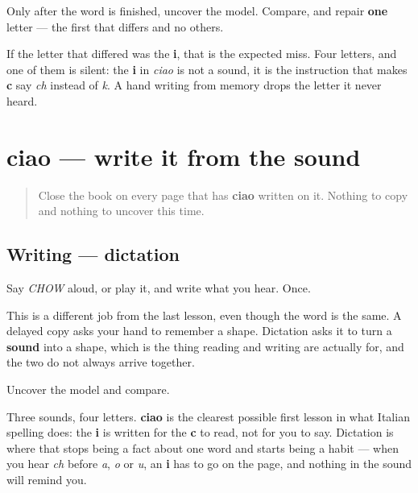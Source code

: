 Only after the word is finished, uncover the model. Compare, and repair \textbf{one} letter — the first that differs and no others.

\begin{tcolorbox}[breakable,colback=teal!4,colframe=teal!35!black,title={Before you move on}]
If the letter that differed was the \textbf{i}, that is the expected miss. Four letters, and one of them is silent: the \textbf{i} in \emph{ciao} is not a sound, it is the instruction that makes \textbf{c} say \emph{ch} instead of \emph{k}. A hand writing from memory drops the letter it never heard.
\end{tcolorbox}
\section[ciao]{ciao — write it from the sound}

\label{lesson:IT-W01-ciao-dictation}



\begin{quote}
Close the book on every page that has \textbf{ciao} written on it. Nothing to copy and nothing to uncover this time.
\end{quote}

\subsection*{Writing — dictation}
Say \emph{CHOW} aloud, or play it, and write what you hear. Once.

This is a different job from the last lesson, even though the word is the same. A delayed copy asks your hand to remember a shape. Dictation asks it to turn a \textbf{sound} into a shape, which is the thing reading and writing are actually for, and the two do not always arrive together.

\begin{tcolorbox}[breakable,colback=teal!4,colframe=teal!35!black,title={Before you move on}]
Uncover the model and compare.

Three sounds, four letters. \textbf{ciao} is the clearest possible first lesson in what Italian spelling does: the \textbf{i} is written for the \textbf{c} to read, not for you to say. Dictation is where that stops being a fact about one word and starts being a habit — when you hear \emph{ch} before \emph{a}, \emph{o} or \emph{u}, an \textbf{i} has to go on the page, and nothing in the sound will remind you.
\end{tcolorbox}
